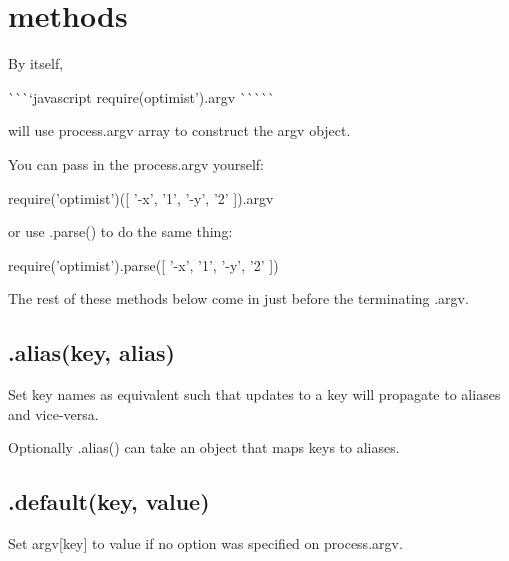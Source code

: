 

\section*{methods }

By itself,

\`{}\`{}\`{}`javascript require(\textquotesingle{}optimist').argv \`{}\`{}\`{}\`{}\`{}

will use {\ttfamily process.\+argv} array to construct the {\ttfamily argv} object.

You can pass in the {\ttfamily process.\+argv} yourself\+:


\begin{DoxyCode}
require('optimist')([ '-x', '1', '-y', '2' ]).argv
\end{DoxyCode}


or use .parse() to do the same thing\+:


\begin{DoxyCode}
require('optimist').parse([ '-x', '1', '-y', '2' ])
\end{DoxyCode}


The rest of these methods below come in just before the terminating {\ttfamily .argv}.

\subsection*{.alias(key, alias) }

Set key names as equivalent such that updates to a key will propagate to aliases and vice-\/versa.

Optionally {\ttfamily .alias()} can take an object that maps keys to aliases.

\subsection*{.default(key, value) }

Set {\ttfamily argv\mbox{[}key\mbox{]}} to {\ttfamily value} if no option was specified on {\ttfamily process.\+argv}.

